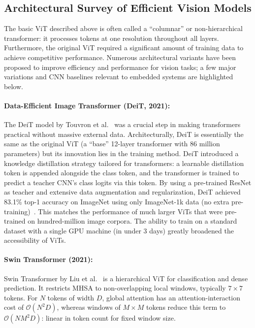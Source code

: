 \documentclass[runningheads,a4paper]{llncs}
\begin{document}
\subsection{Architectural Survey of Efficient Vision Models}\label{sec:arch-survey}
The basic ViT described above is often called a “columnar” or non-hierarchical transformer: it processes tokens at one resolution throughout all layers. Furthermore, the original ViT required a significant amount of training data to achieve competitive performance. Numerous architectural variants have been proposed to improve efficiency and performance for vision tasks; a few major variations and CNN baselines relevant to embedded systems are highlighted below.

\paragraph{Data-Efficient Image Transformer (DeiT, 2021):} The DeiT model by Touvron et al.~\cite{touvron2021deit} was a crucial step in making transformers practical without massive external data. Architecturally, DeiT is essentially the same as the original ViT (a “base” 12-layer transformer with 86 million parameters) but its innovation lies in the training method. DeiT introduced a knowledge distillation strategy tailored for transformers: a learnable distillation token is appended alongside the class token, and the transformer is trained to predict a teacher CNN’s class logits via this token. By using a pre-trained ResNet as teacher and extensive data augmentation and regularization, DeiT achieved 83.1\% top-1 accuracy on ImageNet using only ImageNet-1k data (no extra pre-training)~\cite{touvron2021deit}. This matches the performance of much larger ViTs that were pre-trained on hundred-million image corpora. The ability to train on a standard dataset with a single GPU machine (in under 3 days) greatly broadened the accessibility of ViTs.

\paragraph{Swin Transformer (2021):} Swin Transformer by Liu et al.~\cite{liu2021swin} is a hierarchical ViT for classification and dense prediction. It restricts MHSA to non-overlapping local windows, typically $7\times7$ tokens. For $N$ tokens of width $D$, global attention has an attention-interaction cost of $\mathcal{O}(N^2D)$, whereas windows of $M\times M$ tokens reduce this term to $\mathcal{O}(NM^2D)$: linear in token count for fixed window size.
\end{document}
